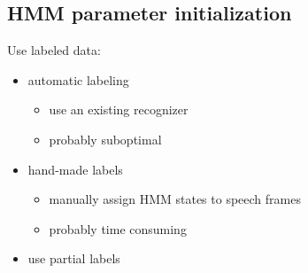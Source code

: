 \subsection{HMM parameter initialization}

Use labeled data:
\begin{itemize}
    \item automatic labeling
        \begin{itemize}
            \item use an existing recognizer
            \item probably suboptimal
        \end{itemize}
    \item hand-made labels
        \begin{itemize}
            \item manually assign HMM states to speech frames
            \item probably time consuming
        \end{itemize}
    \item use partial labels
\end{itemize}

